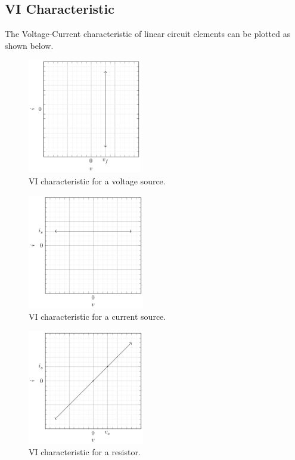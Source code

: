 \documentclass{article}
\begin{document}
\subsection{VI Characteristic}
The Voltage-Current characteristic of linear circuit elements can be
plotted as shown below.
\begin{figure}[H]
    \centering
    \includegraphics[height = 5cm, keepaspectratio = true]{figures/vi_characteristic_voltage_source.pdf}
    \caption{VI characteristic for a voltage source.}
\end{figure}
\begin{figure}[H]
    \centering
    \includegraphics[height = 5cm, keepaspectratio = true]{figures/vi_characteristic_current_source.pdf}
    \caption{VI characteristic for a current source.}
\end{figure}
\begin{figure}[H]
    \centering
    \includegraphics[height = 5cm, keepaspectratio = true]{figures/vi_characteristic_resistor.pdf}
    \caption{VI characteristic for a resistor.}
\end{figure}
\end{document}
